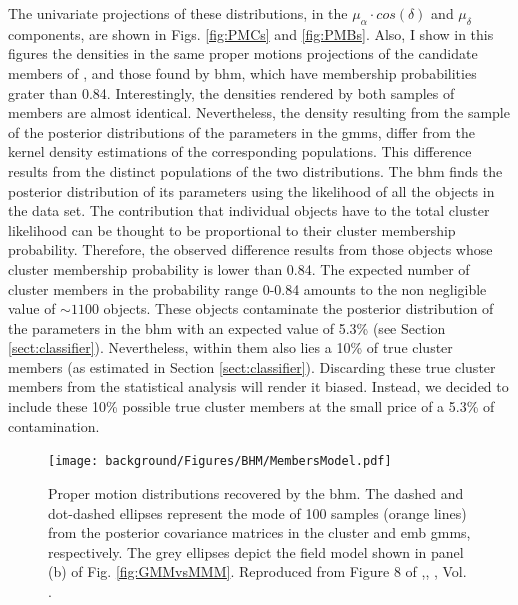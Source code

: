 The univariate projections of these distributions, in the $\mu_{\alpha}\cdot cos(\delta)$ and $\mu_{\delta}$ components, are shown in Figs. \ref{fig:PMCs} and \ref{fig:PMBs}. Also, I show in this figures the densities in the same proper motions projections of the candidate members of \citet{Bouy2015}, and those found by \gls{bhm}, which have membership probabilities grater than 0.84. Interestingly, the densities rendered by both samples of members are almost identical. Nevertheless, the density resulting from the sample of the posterior distributions of the parameters in the \glspl{gmm}, differ from the kernel density estimations of the corresponding populations. This difference results from the distinct populations of the two distributions. The \gls{bhm} finds the posterior distribution of its parameters using the likelihood of all the objects in the data set. The contribution that individual objects have to the total cluster likelihood can be thought to be proportional to their cluster membership probability. Therefore, the observed difference results from those objects whose cluster membership probability is lower than 0.84. The expected number of cluster members in the probability range 0-0.84 amounts to the non negligible value of $\sim 1100$ objects. These objects contaminate the posterior distribution of the parameters in the \gls{bhm} with an expected value of 5.3\% (see Section \ref{sect:classifier}). Nevertheless, within them also lies a 10\% of true cluster members (as estimated in Section \ref{sect:classifier}). Discarding these true cluster members from the statistical analysis will render it biased. Instead, we decided to include these 10\% possible true cluster members at the small price of a 5.3\% of contamination.

\begin{figure}[ht!]
\begin{center}
\texttt{[image: background/Figures/BHM/MembersModel.pdf]}
\caption{Proper motion distributions recovered by the \gls{bhm}. The dashed and dot-dashed ellipses represent the mode of 100 samples (orange lines) from the posterior covariance matrices in the cluster and \gls{emb} \glspl{gmm}, respectively. The grey ellipses depict the field model shown in panel (b) of Fig. \ref{fig:GMMvsMMM}. Reproduced from Figure 8 of \citet{Olivares2017},\textit{}, , Vol. .}
\label{fig:PM}
\end{center}
\end{figure}

